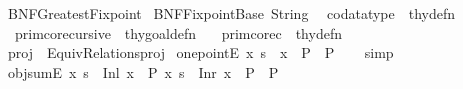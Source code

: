 %
\begin{isabellebody}%
%
%
\isadelimdocument
%
\endisadelimdocument
%
\isatagdocument
%
\isamarkuptrue%
%
\endisatagdocument
{\isafolddocument}%
%
\isadelimdocument
%
\endisadelimdocument
%
\isadelimtheory
%
\endisadelimtheory
%
\isatagtheory
{}\isamarkupfalse%
\ BNF{\isacharunderscore}{\kern0pt}Greatest{\isacharunderscore}{\kern0pt}Fixpoint\isanewline
{}\ BNF{\isacharunderscore}{\kern0pt}Fixpoint{\isacharunderscore}{\kern0pt}Base\ String\isanewline
{}\isanewline
\ \ {\isachardoublequoteopen}codatatype{\isachardoublequoteclose}\ {\isacharcolon}{\kern0pt}{\isacharcolon}{\kern0pt}\ thy{\isacharunderscore}{\kern0pt}defn\ \isanewline
\ \ {\isachardoublequoteopen}primcorecursive{\isachardoublequoteclose}\ {\isacharcolon}{\kern0pt}{\isacharcolon}{\kern0pt}\ thy{\isacharunderscore}{\kern0pt}goal{\isacharunderscore}{\kern0pt}defn\ \isanewline
\ \ {\isachardoublequoteopen}primcorec{\isachardoublequoteclose}\ {\isacharcolon}{\kern0pt}{\isacharcolon}{\kern0pt}\ thy{\isacharunderscore}{\kern0pt}defn\isanewline
{}%
\endisatagtheory
{\isafoldtheory}%
%
\isadelimtheory
\isanewline
%
\endisadelimtheory
\isanewline
{}\isamarkupfalse%
\ proj\ {\isacharequal}{\kern0pt}\ Equiv{\isacharunderscore}{\kern0pt}Relations{\isachardot}{\kern0pt}proj\isanewline
\isanewline
{}\isamarkupfalse%
\ one{\isacharunderscore}{\kern0pt}pointE{\isacharcolon}{\kern0pt}\ {\isachardoublequoteopen}{\isasymlbrakk}{\isasymAnd}x{\isachardot}{\kern0pt}\ s\ {\isacharequal}{\kern0pt}\ x\ {\isasymLongrightarrow}\ P{\isasymrbrakk}\ {\isasymLongrightarrow}\ P{\isachardoublequoteclose}\isanewline
%
\isadelimproof
\ \ %
\endisadelimproof
%
\isatagproof
{}\isamarkupfalse%
\ simp%
\endisatagproof
{\isafoldproof}%
%
\isadelimproof
\isanewline
%
\endisadelimproof
\isanewline
{}\isamarkupfalse%
\ obj{\isacharunderscore}{\kern0pt}sumE{\isacharcolon}{\kern0pt}\ {\isachardoublequoteopen}{\isasymlbrakk}{\isasymforall}x{\isachardot}{\kern0pt}\ s\ {\isacharequal}{\kern0pt}\ Inl\ x\ {\isasymlongrightarrow}\ P{\isacharsemicolon}{\kern0pt}\ {\isasymforall}x{\isachardot}{\kern0pt}\ s\ {\isacharequal}{\kern0pt}\ Inr\ x\ {\isasymlongrightarrow}\ P{\isasymrbrakk}\ {\isasymLongrightarrow}\ P{\isachardoublequoteclose}\isanewline
%
\isadelimproof

\end{isabellebody}
